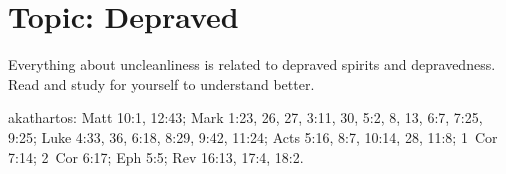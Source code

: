 \section{Topic: Depraved}

Everything about uncleanliness is related to depraved spirits and depravedness. Read and study for yourself to understand better. 

\gls{akathartos}: Matt 10:1, 12:43; Mark 1:23, 26, 27, 3:11, 30, 5:2, 8, 13, 6:7, 7:25, 9:25; Luke 4:33, 36, 6:18, 8:29, 9:42, 11:24; Acts 5:16, 8:7, 10:14, 28, 11:8; 1~Cor 7:14; 2~Cor 6:17; Eph 5:5; Rev 16:13, 17:4, 18:2.
